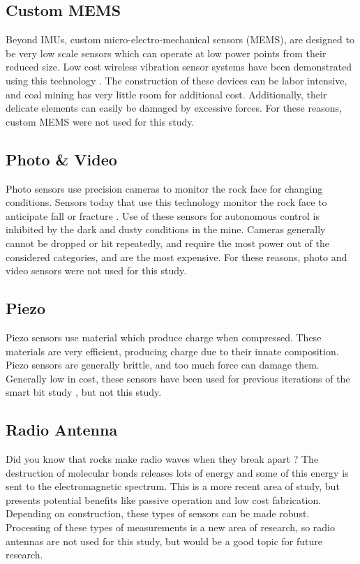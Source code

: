 \subsection{Custom MEMS}
Beyond IMUs, custom micro-electro-mechanical sensors (MEMS), are designed to be very low scale
sensors which can operate at low power points from their reduced size. 
Low cost wireless vibration sensor systems have been demonstrated using this technology \cite{9234762}.
The construction of these devices can be labor intensive, and coal mining has very little room for additional cost. 
Additionally, their delicate elements can easily be damaged by excessive forces. 
For these reasons, custom MEMS were not used for this study.

\subsection{Photo \& Video}
Photo sensors use precision cameras to monitor the rock face for changing conditions.
Sensors today that use this technology monitor the rock face to anticipate fall or fracture \cite{duarte2022sensing}.
Use of these sensors for autonomous control is inhibited by the dark and dusty conditions in the mine.
Cameras generally cannot be dropped or hit repeatedly, and require the most power out of the considered categories,
and are the most expensive. For these reasons, photo and video sensors were not used for this study.

\subsection{Piezo}
Piezo sensors use material which produce charge when compressed. 
These materials are very efficient, producing charge due to their innate composition.
Piezo sensors are generally brittle, and too much force can damage them.
Generally low in cost, these sensors have been used for 
previous iterations of the smart bit study \cite{11124/170545}, but not this study.

\subsection{Radio Antenna}
Did you know that rocks make radio waves when they break apart \cite{qian1996experimental}? 
The destruction of molecular bonds releases lots of energy
 and some of this energy is sent to the electromagnetic spectrum.
This is a more recent area of study, but presents potential benefits like
passive operation and low cost fabrication. 
Depending on construction, these types of sensors can be made robust.
Processing of these types of measurements is a new area of research,
so radio antennas are not used for this study, 
but would be a good topic for future research.


